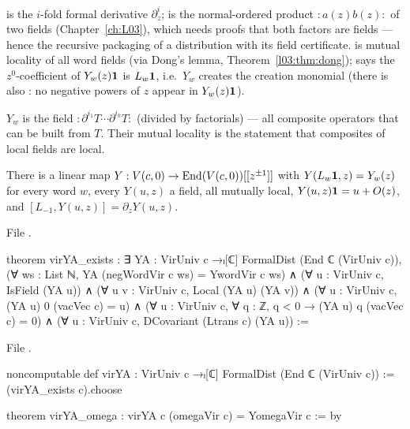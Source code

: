\begin{dictionary}
 is the $i$-fold formal derivative $\partial_z^i$;  is the normal-ordered
product ${:}a(z)b(z){:}$ of two fields (Chapter~\ref{ch:L03}), which needs proofs that both factors are
fields --- hence the recursive packaging  of a distribution with its field
certificate.  is mutual locality of all word fields (via Dong's lemma,
Theorem~\ref{l03:thm:dong});  says the $z^0$-coefficient of $Y_w(z)\mathbf{1}$ is
$L_w\mathbf{1}$, i.e.\ $Y_w$ creates the creation monomial (there is also : no
negative powers of $z$ appear in $Y_w(z)\mathbf{1}$).
\end{dictionary}

\begin{physics}
$Y_w$ is the field ${:}\partial^{i_1}T\cdots\partial^{i_k}T{:}$ (divided by factorials) --- all composite
operators that can be built from $T$. Their mutual locality is the statement that composites of local
fields are local.
\end{physics}

\begin{theorem}\label{l06:thm:virYA}
There is a linear map $Y:V(c,0)\to\operatorname{End}(V(c,0))[[z^{\pm1}]]$ with $Y(L_w\mathbf{1},z) = Y_w(z)$ for every
word $w$, every $Y(u,z)$ a field, all mutually local, $Y(u,z)\mathbf{1} = u+O(z)$, and
$[L_{-1},Y(u,z)] = \partial_zY(u,z)$.
\end{theorem}

File .
\begin{leancode}
theorem virYA_exists :
    ∃ YA : VirUniv c →ₗ[ℂ] FormalDist (End ℂ (VirUniv c)),
      (∀ ws : List ℕ, YA (negWordVir c ws) = YwordVir c ws) ∧
      (∀ u : VirUniv c, IsField (YA u)) ∧
      (∀ u v : VirUniv c, Local (YA u) (YA v)) ∧
      (∀ u : VirUniv c, (YA u) 0 (vacVec c) = u) ∧
      (∀ u : VirUniv c, ∀ q : ℤ, q < 0 → (YA u) q (vacVec c) = 0) ∧
      (∀ u : VirUniv c, DCovariant (Ltrans c) (YA u)) :=
\end{leancode}
File .
\begin{leancode}
noncomputable def virYA : VirUniv c →ₗ[ℂ] FormalDist (End ℂ (VirUniv c)) := (virYA_exists c).choose

theorem virYA_omega : virYA c (omegaVir c) = YomegaVir c := by
\end{leancode}

